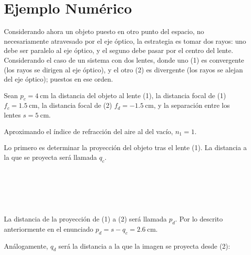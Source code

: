 \section{Ejemplo Numérico}

Considerando ahora un objeto puesto en otro punto del espacio, no
necesariamente atravesado por el eje óptico, la estrategia es tomar dos
rayos: uno debe ser paralelo al eje óptico, y el seguno debe pasar por
el centro del lente. Considerando el caso de un sistema con dos lentes,
donde uno (1) es convergente (los rayos se dirigen al eje óptico), y el
otro (2) es divergente (los rayos se alejan del eje óptico); puestos en ese
orden.

Sean $p_c = \qty{4}{\cm}$ la distancia del objeto al lente (1),
la distancia focal de (1) $f_c=\qty{1.5}{\cm}$, la distancia focal de
(2) $f_d = \qty{-1.5}{\cm}$, y la separación entre los lentes
$s = \qty{5}{\cm}$.

Aproximando el índice de refracción del aire al del vacío, $n_1 = 1$.

Lo primero es determinar la proyección del objeto tras el lente (1).
La distancia a la que se proyecta será llamada $q_c$.

\begin{longderivation}
        \\
    \equiv\\
        \\
    \equiv\\
\end{longderivation}

La distancia de la proyección de (1) a (2) será llamada $p_d$. Por lo
descrito anteriormente en el enunciado $p_d = s - q_c = \qty{2.6}{\cm}$.

Análogamente, $q_d$ será la distancia a la que la imagen se proyecta desde (2):
\begin{longderivation}
        \\
    \equiv\\
        \\
    \equiv\\
\end{longderivation}